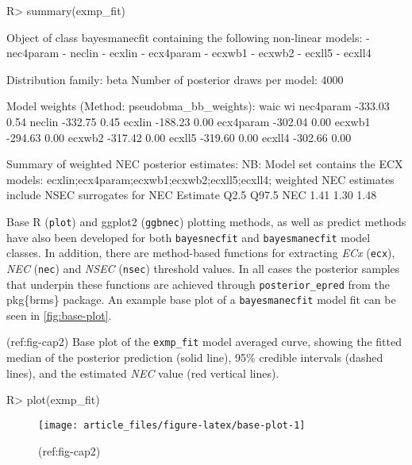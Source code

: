 \documentclass[
]{jss}
\begin{document}
\begin{CodeChunk}
\begin{CodeInput}
R> summary(exmp_fit)
\end{CodeInput}
\begin{CodeOutput}
Object of class bayesmanecfit containing the following non-linear models:
  -  nec4param
  -  neclin
  -  ecxlin
  -  ecx4param
  -  ecxwb1
  -  ecxwb2
  -  ecxll5
  -  ecxll4

Distribution family: beta
Number of posterior draws per model:  4000

Model weights (Method: pseudobma_bb_weights):
             waic   wi
nec4param -333.03 0.54
neclin    -332.75 0.45
ecxlin    -188.23 0.00
ecx4param -302.04 0.00
ecxwb1    -294.63 0.00
ecxwb2    -317.42 0.00
ecxll5    -319.60 0.00
ecxll4    -302.66 0.00


Summary of weighted NEC posterior estimates:
NB: Model set contains the ECX models: ecxlin;ecx4param;ecxwb1;ecxwb2;ecxll5;ecxll4; weighted NEC estimates include NSEC surrogates for NEC
    Estimate Q2.5 Q97.5
NEC     1.41 1.30  1.48
\end{CodeOutput}
\end{CodeChunk}

Base R (\texttt{plot}) and ggplot2 (\texttt{ggbnec}) plotting methods,
as well as predict methods have also been developed for both
\texttt{bayesnecfit} and \texttt{bayesmanecfit} model classes. In
addition, there are method-based functions for extracting \emph{ECx}
(\texttt{ecx}), \emph{NEC} (\texttt{nec}) and \emph{NSEC}
(\texttt{nsec}) threshold values. In all cases the posterior samples
that underpin these functions are achieved through
\texttt{posterior\_epred} from the pkg\{brms\} package. An example base
plot of a \texttt{bayesmanecfit} model fit can be seen in
\autoref{fig:base-plot}.

(ref:fig-cap2) Base plot of the \texttt{exmp\_fit} model averaged curve,
showing the fitted median of the posterior prediction (solid line), 95\%
credible intervals (dashed lines), and the estimated \emph{NEC} value
(red vertical lines).

\begin{CodeChunk}
\begin{CodeInput}
R> plot(exmp_fit)
\end{CodeInput}
\begin{figure}

{\centering \texttt{[image: article\_files/figure-latex/base-plot-1]} 

}

\caption[(ref:fig-cap2)]{(ref:fig-cap2)}\label{fig:base-plot}
\end{figure}
\end{CodeChunk}
\end{document}
